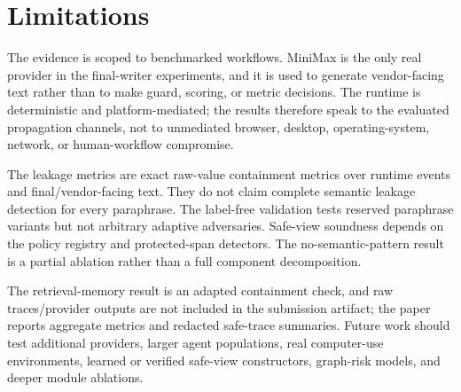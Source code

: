\section{Limitations}
\label{sec:limitations}

The evidence is scoped to benchmarked workflows. MiniMax is the only real provider in the final-writer experiments, and it is used to generate vendor-facing text rather than to make guard, scoring, or metric decisions. The runtime is deterministic and platform-mediated; the results therefore speak to the evaluated propagation channels, not to unmediated browser, desktop, operating-system, network, or human-workflow compromise.

The leakage metrics are exact raw-value containment metrics over runtime events and final/vendor-facing text. They do not claim complete semantic leakage detection for every paraphrase. The label-free validation tests reserved paraphrase variants but not arbitrary adaptive adversaries. Safe-view soundness depends on the policy registry and protected-span detectors. The no-semantic-pattern result is a partial ablation rather than a full component decomposition.

The retrieval-memory result is an adapted containment check, and raw traces/provider outputs are not included in the submission artifact; the paper reports aggregate metrics and redacted safe-trace summaries. Future work should test additional providers, larger agent populations, real computer-use environments, learned or verified safe-view constructors, graph-risk models, and deeper module ablations.
